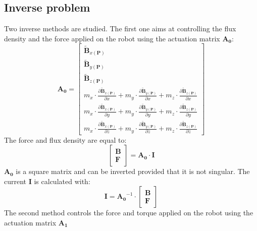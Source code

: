 \subsection{Inverse problem}
Two inverse methods are studied. The first one aims at controlling the flux density and the force applied on the robot using the actuation matrix $\mathbf{A_0}$:
%
\begin{equation}
\mathbf{A_0}=\begin{bmatrix}
\mathbf{\widetilde{B}}_{x(\mathbf{P})}
\\
\mathbf{\widetilde{B}}_{y(\mathbf{P})}
\\ 
\mathbf{\widetilde{B}}_{z(\mathbf{P})}
\\ 
m_x\cdot\frac{{\partial {\mathbf{\widetilde{B}}}_{x(\mathbf{P})}}}{\partial x}+m_y\cdot\frac{{\partial {\mathbf{\widetilde{B}}}_{y(\mathbf{P})}}}{\partial x}+m_z\cdot\frac{{\partial {\mathbf{\widetilde{B}}}_{z(\mathbf{P})}}}{\partial x}
\\ 
m_x\cdot\frac{{\partial {\mathbf{\widetilde{B}}}_{x(\mathbf{P})}}}{\partial y}+m_y\cdot\frac{{\partial {\mathbf{\widetilde{B}}}_{y(\mathbf{P})}}}{\partial y}+m_z\cdot\frac{{\partial {\mathbf{\widetilde{B}}}_{z(\mathbf{P})}}}{\partial y}
\\ 
m_x\cdot\frac{{\partial {\mathbf{\widetilde{B}}}_{x(\mathbf{P})}}}{\partial z}+m_y\cdot\frac{{\partial {\mathbf{\widetilde{B}}}_{y(\mathbf{P})}}}{\partial z}+m_z\cdot\frac{{\partial {\mathbf{\widetilde{B}}}_{z(\mathbf{P})}}}{\partial z}
\end{bmatrix}
\end{equation}
%
The force and flux density are equal to:
\begin{equation}
\label{FullEq}
\begin{bmatrix}
\mathbf{B}
\\ 
\mathbf{F}
\end{bmatrix}=\mathbf{A_0}\cdot\mathbf{I}
\end{equation}
$\mathbf{A_0}$ is a square matrix and can be inverted provided that it is not singular. The current $\mathbf{I}$ is calculated with:
%
\begin{equation}
\mathbf{I}=\mathbf{A_0}^{-1}\cdot\begin{bmatrix}
\mathbf{B}
\\ 
\mathbf{F}
\end{bmatrix}
\end{equation}
%
The second method controls the force and torque applied on the robot using the actuation matrix $\mathbf{A_1}$
%
